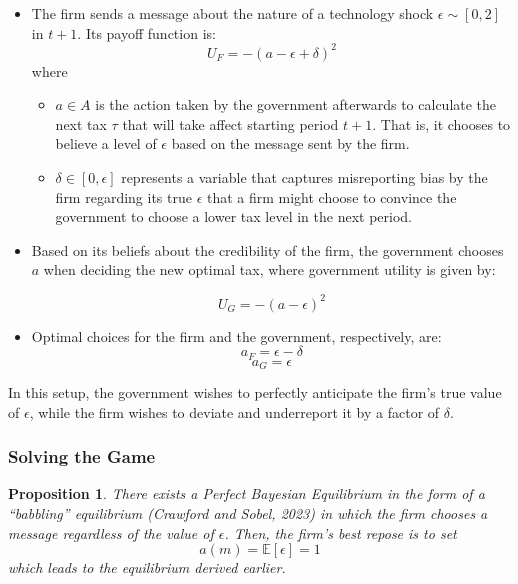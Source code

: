 \documentclass{article}
\newtheorem{proposition}{Proposition}
\begin{document}
\begin{itemize}
\item The firm sends a message about the nature of a technology shock $\epsilon \sim [0,2]$ in $t+1$. 
    Its payoff function is:
    \begin{equation}
    U_F = - (a - \epsilon + \delta)^2
    \end{equation}
where 
\begin{itemize}
    \item $a \in A$ is the action taken by the government afterwards to calculate the next tax $\tau$ that will take affect starting period $t+1$. That is, it chooses to believe a level of $\epsilon$ based on the message sent by the firm.  
    \item $\delta \in [0, \epsilon]$ represents a variable that captures misreporting bias by the firm regarding its true $\epsilon$ that a firm might choose to convince the government to choose a lower tax level in the next period.
\end{itemize}
\item Based on its beliefs about the credibility of the firm, the government chooses $a$ when deciding the new optimal tax, where government utility is given by:

\begin{equation}
    U_G = - (a - \epsilon)^2
\end{equation}

\item Optimal choices for the firm and the government, respectively, are:
    \begin{equation*}
        a_F = \epsilon - \delta
    \end{equation*} 
    \begin{equation*}
        a_G = \epsilon
    \end{equation*}
\end{itemize}
In this setup, the government wishes to perfectly anticipate the firm's true value of $\epsilon$, while the firm wishes to deviate and underreport it by a factor of $\delta$.

\subsubsection{Solving the Game}

\begin{proposition}
    There exists a Perfect Bayesian Equilibrium in the form of a “babbling” equilibrium (Crawford and Sobel, 2023) in which the firm chooses a message regardless of the value of $\epsilon$. Then, the firm's best repose is to set 
    \begin{equation*}
        a(m) = \mathbb{E}[\epsilon] = 1
    \end{equation*}
    which leads to the equilibrium derived earlier. \\
\end{proposition} 
\end{document}
